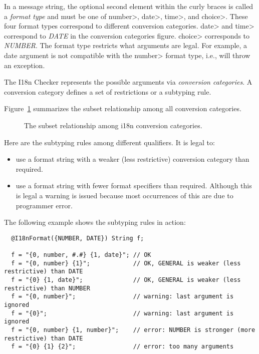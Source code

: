 
In a message string, the optional second element within the curly braces is
called a \emph{format type} and must be one of \<number>, \<date>,
\<time>, and \<choice>. These four format types correspond to different
conversion categories. \<date> and \<time> correspond to \emph{DATE} in the
conversion categories figure. \<choice> corresponds to \emph{NUMBER}.
The format type restricts what arguments are legal.
For example, a date argument is not compatible with
the \<number> format type, i.e.,  will throw an exception.

The I18n Checker represents the possible arguments via \emph{conversion
  categories}.  A conversion category defines a set of restrictions or a
subtyping rule.

Figure~\ref{i18n-format-category} summarizes the subset
relationship among all conversion categories.

\begin{figure}
    \caption{The subset relationship among
        i18n
        conversion categories.}
    \label{i18n-format-category}
\end{figure}



Here are the subtyping rules among different
qualifiers.
It is legal to:

\begin{itemize}
\item use a format string with a weaker (less restrictive) conversion category than required.
\item use a format string with fewer format specifiers than required.
  Although this is legal a warning is issued because most occurrences of
  this are due to programmer error.
\end{itemize}

The following example shows the subtyping rules in action:

\begin{Verbatim}
  @I18nFormat({NUMBER, DATE}) String f;

  f = "{0, number, #.#} {1, date}"; // OK
  f = "{0, number} {1}";            // OK, GENERAL is weaker (less restrictive) than DATE
  f = "{0} {1, date}";              // OK, GENERAL is weaker (less restrictive) than NUMBER
  f = "{0, number}";                // warning: last argument is ignored
  f = "{0}";                        // warning: last argument is ignored
  f = "{0, number} {1, number}";    // error: NUMBER is stronger (more restrictive) than DATE
  f = "{0} {1} {2}";                // error: too many arguments
\end{Verbatim}

